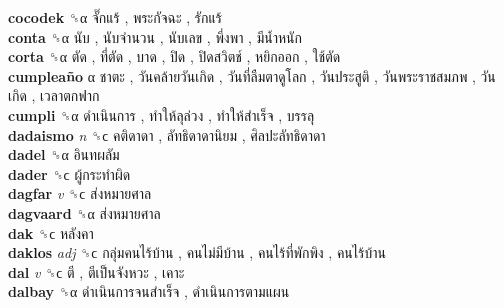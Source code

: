 \textbf{cocodek} ␝α   จั๊กแร้ ,  พระกัจฉะ ,  รักแร้   \\
\textbf{conta} ␝α   นับ ,  นับจำนวน ,  นับเลข ,  พึ่งพา ,  มีน้ำหนัก   \\
\textbf{corta} ␝α   ตัด ,  ที่ตัด ,  บาด ,  ปิด ,  ปิดสวิตช์ ,  หยิกออก ,  ใช้ตัด   \\
\textbf{cumpleaño} α   ชาตะ ,  วันคล้ายวันเกิด ,  วันที่ลืมตาดูโลก ,  วันประสูติ ,  วันพระราชสมภพ ,  วันเกิด ,  เวลาตกฟาก   \\
\textbf{cumpli} ␝α   ดำเนินการ ,  ทำให้ลุล่วง ,  ทำให้สำเร็จ ,  บรรลุ   \\
\textbf{dadaismo} \emph{n}  ␝ϲ   คติดาดา ,  ลัทธิดาดานิยม ,  ศิลปะลัทธิดาดา   \\
\textbf{dadel} ␝α   อินทผลัม   \\
\textbf{dader} ␝ϲ   ผู้กระทำผิด   \\
\textbf{dagfar} \emph{v}  ␝ϲ   ส่งหมายศาล   \\
\textbf{dagvaard} ␝α   ส่งหมายศาล   \\
\textbf{dak} ␝ϲ   หลังคา   \\
\textbf{daklos} \emph{adj}  ␝ϲ   กลุ่มคนไร้บ้าน ,  คนไม่มีบ้าน ,  คนไร้ที่พักพิง ,  คนไร้บ้าน   \\
\textbf{dal} \emph{v}  ␝ϲ   ตี ,  ตีเป็นจังหวะ ,  เคาะ   \\
\textbf{dalbay} ␝α   ดำเนินการจนสำเร็จ ,  ดำเนินการตามแผน   \\
